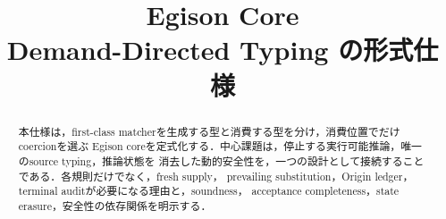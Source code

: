 \documentclass[a4paper,10pt]{ltjsarticle}
\title{Egison Core\\Demand-Directed Typing の形式仕様}
\author{}
\date{}
\begin{document}
\maketitle
\begin{abstract}
本仕様は，first-class matcherを生成する型と消費する型を分け，消費位置でだけcoercionを選ぶ
Egison coreを定式化する．中心課題は，停止する実行可能推論，唯一のsource typing，推論状態を
消去した動的安全性を，一つの設計として接続することである．各規則だけでなく，fresh supply，
prevailing substitution，Origin ledger，terminal auditが必要になる理由と，soundness，
acceptance completeness，state erasure，安全性の依存関係を明示する．
\end{abstract}
\setcounter{tocdepth}{1}
\tableofcontents
\clearpage








\end{document}
